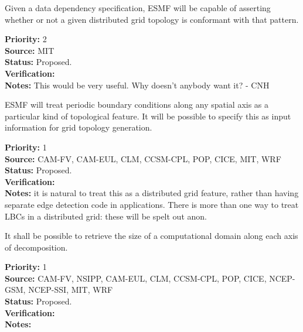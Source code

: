 
Given a data dependency specification, ESMF will be capable of
asserting whether or not a given distributed grid topology is
conformant with that pattern.

\begin{reqlist}
{\bf Priority:} 2 \\ 
{\bf Source:} MIT \\
{\bf Status:} Proposed. \\
{\bf Verification:} \\
{\bf Notes:} This would be very useful. Why doesn't anybody want it? - CNH
\end{reqlist}


ESMF will treat periodic boundary conditions along any spatial axis as
a particular kind of topological feature. It will be possible to
specify this as input information for grid topology generation.

\begin{reqlist}
{\bf Priority:} 1 \\ 
{\bf Source:} CAM-FV, CAM-EUL, CLM, CCSM-CPL, POP, CICE, MIT, WRF \\
{\bf Status:} Proposed. \\
{\bf Verification:} \\
{\bf Notes:} it is natural to treat this as a distributed grid
  feature, rather than having separate edge detection code in
  applications. There is more than one way to treat LBCs in a
  distributed grid: these will be spelt out anon.
   
\end{reqlist}




It shall be possible to retrieve the size of a computational domain
along each axis of decomposition.

\begin{reqlist}
{\bf Priority:} 1 \\ 
{\bf Source:} CAM-FV, NSIPP, CAM-EUL, CLM, CCSM-CPL, POP, CICE, NCEP-GSM, NCEP-SSI, MIT, WRF \\
{\bf Status:} Proposed. \\
{\bf Verification:} \\
{\bf Notes:}
\end{reqlist}

